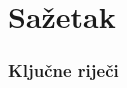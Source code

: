 




    \cleardoublepage
    \chapter*{Sažetak}
    
    
    

    
    
    \strut
    \vfil
    \subsection*{Ključne riječi}
